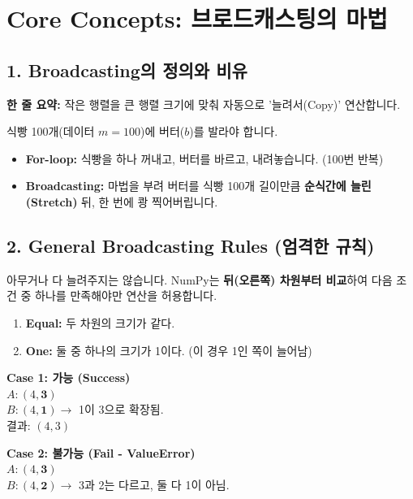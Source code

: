 \documentclass[11pt,a4paper]{book}
\theoremstyle{definition}
\begin{document}
\section{Core Concepts: 브로드캐스팅의 마법}

\subsection{1. Broadcasting의 정의와 비유}
\textbf{한 줄 요약:} 작은 행렬을 큰 행렬 크기에 맞춰 자동으로 '늘려서(Copy)' 연산합니다.

\begin{analogybox}[title={식빵과 버터 비유}]
식빵 100개(데이터 $m=100$)에 버터($b$)를 발라야 합니다.
\begin{itemize}
    \item \textbf{For-loop:} 식빵을 하나 꺼내고, 버터를 바르고, 내려놓습니다. (100번 반복)
    \item \textbf{Broadcasting:} 마법을 부려 버터를 식빵 100개 길이만큼 \textbf{순식간에 늘린(Stretch)} 뒤, 한 번에 쾅 찍어버립니다.
\end{itemize}
\end{analogybox}


\subsection{2. General Broadcasting Rules (엄격한 규칙)}
아무거나 다 늘려주지는 않습니다. NumPy는 \textbf{뒤(오른쪽) 차원부터 비교}하여 다음 조건 중 하나를 만족해야만 연산을 허용합니다.

\begin{enumerate}
    \item \textbf{Equal:} 두 차원의 크기가 같다.
    \item \textbf{One:} 둘 중 하나의 크기가 1이다. (이 경우 1인 쪽이 늘어남)
\end{enumerate}

\begin{tcolorbox}[colback=white, colframe=black, title=Rule Check Example]
\textbf{Case 1: 가능 (Success)} \\
$A: (4, \mathbf{3})$ \\
$B: (4, \mathbf{1}) \rightarrow$ 1이 3으로 확장됨. \\
결과: $(4, 3)$

\textbf{Case 2: 불가능 (Fail - ValueError)} \\
$A: (4, \mathbf{3})$ \\
$B: (4, \mathbf{2}) \rightarrow$ 3과 2는 다르고, 둘 다 1이 아님.
\end{tcolorbox}
\end{document}
